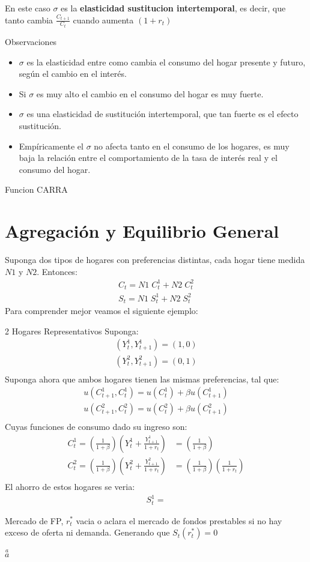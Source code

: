 \documentclass[12pt]{article}
\begin{document}
En este caso $\sigma$ es la \textbf{elasticidad sustitucion intertemporal}, es decir, que tanto cambia $\frac{C_{t+1}}{C_t}$ cuando aumenta $(1+r_t)$\\

\begin{importante}{Observaciones}
    \begin{itemize}
    \item $\sigma$ es la elasticidad entre como cambia el consumo del hogar presente y futuro, según el cambio en el interés. 
    \item Si $\sigma$ es muy alto el cambio en el consumo del hogar es muy fuerte. 
    \item $\sigma$ es una elasticidad de sustitución intertemporal, que tan fuerte es el efecto sustitución. 
    \item Empíricamente el $\sigma$ no afecta tanto en el consumo de los hogares, es muy baja la relación entre el comportamiento de la tasa de interés real y el consumo del hogar. 
\end{itemize}
\end{importante} 
\begin{ejemplo}{Funcion CARRA}
    
\end{ejemplo}


\section{Agregación y Equilibrio General}
Suponga dos tipos de hogares con preferencias distintas, cada hogar tiene medida $N1$ y $N2$. 
Entonces: 
\begin{align*}
    C_t=N1\;C_t^1+N2\;C_t^2\\
    S_t=N1\;S_t^1+N2\;S_t^2
\end{align*}
Para comprender mejor veamos el siguiente ejemplo: 
\begin{ejemplo}{2 Hogares Representativos}
    Suponga: 
    \begin{align*}
        (Y_t^1,Y_{t+1}^1)=(1,0)\\
        (Y_t^2,Y_{t+1}^2)=(0,1)\\
    \end{align*}
    Suponga ahora que ambos hogares tienen las mismas preferencias, tal que: 
    \begin{align*}
        u(C_{t+1}^1,C_t^1)=u(C_t^1)+\beta u(C_{t+1}^1)\\
        u(C_{t+1}^2,C_t^2)=u(C_t^2)+\beta u(C_{t+1}^2)\\
    \end{align*}
    Cuyas funciones de consumo dado su ingreso son: 
    \begin{align*}
        C_t^1=(\frac{1}{1+\beta})(Y_t^1+\frac{Y_{t+1}^1}{1+r_t})&=(\frac{1}{1+\beta})\\
        C_t^2=(\frac{1}{1+\beta})(Y_t^2+\frac{Y_{t+1}^2}{1+r_t})& =(\frac{1}{1+\beta})(\frac{1}{1+r_t})\\
    \end{align*}
    El ahorro de estos hogares se veria: 
    \begin{align*}
        S_t^1=
    \end{align*}
\end{ejemplo}

Mercado de FP, $r_t^*$ vacia o aclara el mercado de fondos prestables si no hay exceso de oferta ni demanda. Generando que $S_t(r_t^*)=0$


$\overset{a}{a}$
\end{document}
